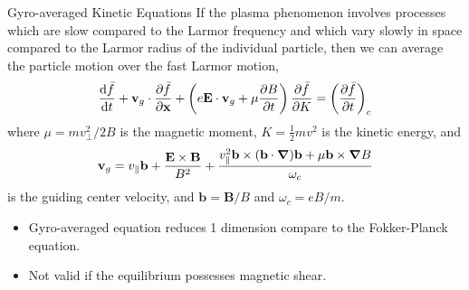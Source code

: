 \begin{frame}{Gyro-averaged Kinetic Equations}
    If the plasma phenomenon involves processes which are slow compared to the Larmor frequency and which vary slowly in space compared to the Larmor radius of the individual particle, then we can average the particle motion over the fast Larmor motion,
    \begin{equation}
        \dv{\bar{f}}{t} + \mathbf{v}_g\cdot\pdv{\bar{f}}{\mathbf{x}} + \left(e\mathbf{E}\cdot\mathbf{v}_g+\mu\pdv{B}{t}\right)\pdv{\bar{f}}{K} = \left(\pdv{\bar{f}}{t}\right)_c
        \label{eq:gyro-averaged-equation}
    \end{equation}
    where $\mu=mv_\perp^2/2B$ is the magnetic moment, $K=\frac{1}{2}mv^2$ is the kinetic energy, and
    \begin{equation}
        \mathbf{v}_g = v_\parallel\mathbf{b} + \frac{\mathbf{E\times B}}{B^2} + \frac{v_\parallel^2\mathbf{b\times (b\cdot\grad)b} + \mu\mathbf{b\times\grad}B}{\omega_c}
        \label{eq:guiding-center-velocity}
    \end{equation}
    is the guiding center velocity, and $\mathbf{b}=\mathbf{B}/B$ and $\omega_c = eB/m$.

    \begin{itemize}
        \item Gyro-averaged equation reduces 1 dimension compare to the Fokker-Planck equation.
        \item Not valid if the equilibrium possesses magnetic shear.
    \end{itemize}
\end{frame}

